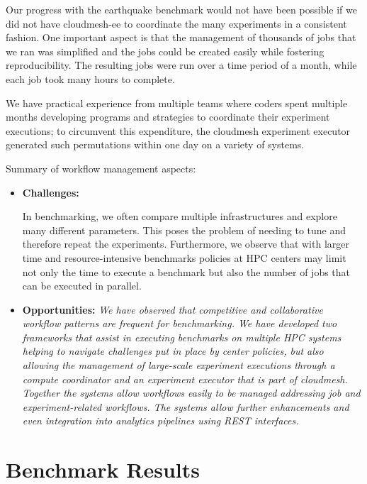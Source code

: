 \documentclass[utf8]{FrontiersinVancouver} %
\begin{document}
Our progress with the earthquake benchmark would not have been possible if we did not have cloudmesh-ee to coordinate the many experiments in a consistent fashion. One important aspect is that the management of thousands of jobs that we ran was simplified and the jobs could be created easily while fostering reproducibility. The resulting jobs were run over a time period of a month, while each job took many hours to complete.

We have practical experience from multiple teams where coders spent multiple months developing programs and strategies to coordinate their experiment executions; to circumvent this expenditure, the cloudmesh experiment executor generated such permutations within one day on a variety of systems.

\begin{tcolorbox}
Summary of workflow management aspects:

\begin{itemize}

\item {\bf Challenges:} {\it 

In benchmarking, we often compare multiple infrastructures and explore many different parameters. This poses the problem of needing to tune and therefore repeat the experiments. Furthermore, we observe that with larger time and resource-intensive benchmarks policies at HPC centers may limit not only the time to execute a benchmark but also the number of jobs that can be executed in parallel.
}


\item {\bf Opportunities:} {\it We have observed that competitive and collaborative workflow patterns are frequent for benchmarking. We have developed two frameworks that assist in executing benchmarks on multiple HPC systems helping to navigate challenges put in place by center policies, but also allowing the management of large-scale experiment executions through a compute coordinator and an experiment executor that is part of cloudmesh. Together the systems allow workflows easily to be managed addressing job and experiment-related workflows. The systems allow further enhancements and even integration into analytics pipelines using REST interfaces.}

\end{itemize}
\end{tcolorbox}
  


\section{Benchmark Results}
\label{sec:results}
\end{document}
